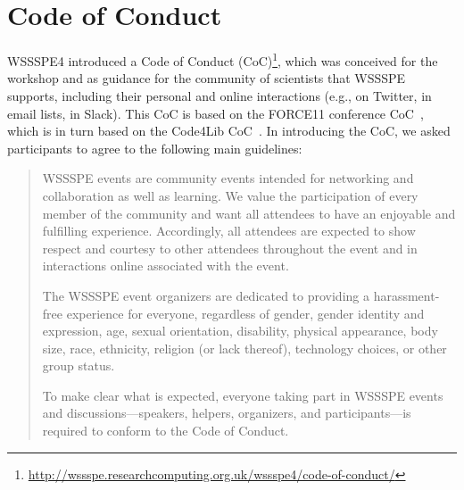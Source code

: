 \documentclass[11pt, oneside]{amsart}
\makeatletter
\newcommand\footnoteref[1]{\protected@xdef\@thefnmark{\ref{#1}}\@footnotemark}
\makeatother
\begin{document}
\section{Code of Conduct}\label{sec:CoC}

WSSSPE4 introduced a Code of Conduct (CoC)\footnote{\label{footnote:CoC}\url{http://wssspe.researchcomputing.org.uk/wssspe4/code-of-conduct/}}, which was conceived for the workshop and as guidance for the community of scientists that WSSSPE
supports, including their personal and online interactions (e.g., on
Twitter, in email lists, in Slack). This CoC is based on the
FORCE11 conference CoC~\cite{FORCE11:CoC}, which is in turn based on the Code4Lib
CoC~\cite{Code4Lib:CoC}.
In introducing the CoC, we asked participants to agree to the following main guidelines:
\begin{quote}
    WSSSPE events are community events intended for networking and collaboration
    as well as learning. We value the participation of every member of the
    community and want all attendees to have an enjoyable and fulfilling
    experience. Accordingly, all attendees are expected to show respect and
    courtesy to other attendees throughout the event and in interactions online
    associated with the event.

    The WSSSPE event organizers are dedicated to providing a harassment-free
    experience for everyone, regardless of gender, gender identity and
    expression, age, sexual orientation, disability, physical appearance,
    body size, race, ethnicity, religion (or lack thereof), technology choices,
    or other group status.

    To make clear what is expected, everyone taking part in WSSSPE events and
    discussions---speakers, helpers, organizers, and participants---is required
    to conform to the Code of Conduct\footnoteref{footnote:CoC}.



 \end{quote}
\end{document}
